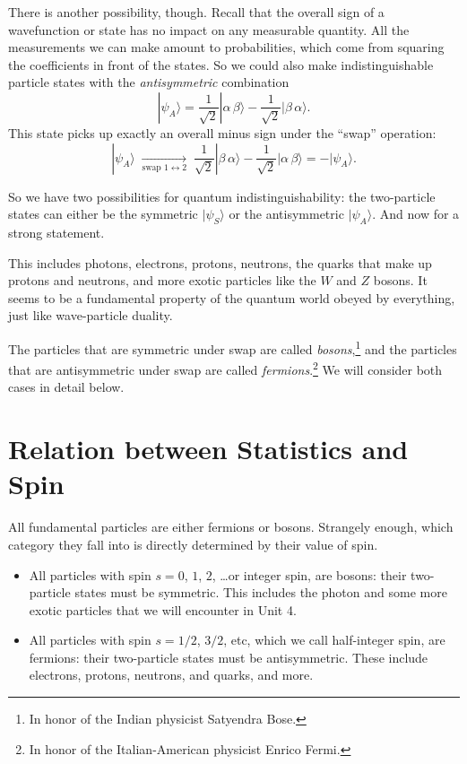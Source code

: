 There is another possibility, though.  Recall that the overall sign of
a wavefunction or state has no impact on any measurable quantity.
All the measurements we can make amount to probabilities, which come
from squaring the coefficients in front of the states.  So we could
also make indistinguishable particle states with the
\textit{antisymmetric} combination
\begin{equation}
 |\psi_A\rangle =  \frac{1}{\sqrt 2} |\alpha\,\beta\rangle
 - \frac{1}{\sqrt 2}|\beta\,\alpha\rangle.
\end{equation}
This state picks up exactly an overall minus sign under the ``swap''
operation:
\begin{equation}
|\psi_A\rangle 
   \;\xrightarrow[\text{swap } 1\leftrightarrow 2]{}  \;
  \frac{1}{\sqrt 2} |\beta\,\alpha\rangle - \frac{1}{\sqrt 2}
 |\alpha\,\beta\rangle
 = -|\psi_A\rangle.
\end{equation}

So we have two possibilities for quantum indistinguishability:
the two-particle states can either be the symmetric $|\psi_S\rangle$
or the antisymmetric $|\psi_A\rangle$.  And now for a strong statement.


\noindent This includes photons, electrons, protons, neutrons, the
quarks that make up protons and neutrons, and more exotic particles
like the $W$ and $Z$ bosons.  It seems to be a fundamental property of
the quantum world obeyed by everything, just like wave-particle
duality.

The particles that are symmetric under swap are called
\textit{bosons},\footnote{In honor of the Indian physicist Satyendra
  Bose.} and the particles that are antisymmetric under swap are
called \textit{fermions}.\footnote{In honor of the Italian-American
  physicist Enrico Fermi.}  We will consider both cases in detail
below.


\section{Relation between Statistics and Spin}
\label{sec:statistics_and_spin}

All fundamental particles are either fermions or bosons.  Strangely
enough, which category they fall into is directly determined by their
value of spin.

\begin{itemize}
\item All particles with spin $s=0$, $1$, $2$, \dots or integer spin,
  are bosons: their two-particle states must be symmetric.  This
  includes the photon and some more exotic particles that we will
  encounter in Unit 4.

\item All particles with spin $s=1/2$, $3/2$, etc, which we call
  half-integer spin, are fermions: their two-particle states must be
  antisymmetric.  These include electrons, protons, neutrons, and
  quarks, and more.
\end{itemize}

